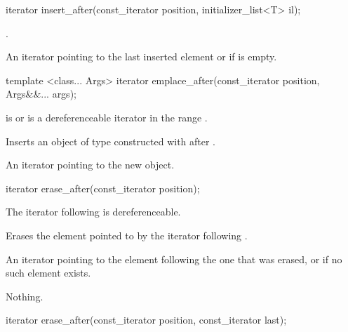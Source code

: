 %
%
\begin{itemdecl}
iterator insert_after(const_iterator position, initializer_list<T> il);
\end{itemdecl}

\begin{itemdescr}
\pnum
\effects {}.

\pnum
\returns
An iterator pointing to the last inserted element or  if  is empty.
\end{itemdescr}


%
%
\begin{itemdecl}
template <class... Args>
  iterator emplace_after(const_iterator position, Args&&... args);
\end{itemdecl}

\begin{itemdescr}
\pnum
\requires {} is  or is a dereferenceable
iterator in the range .

\pnum
\effects Inserts an object of type  constructed with
 after .

\pnum
\returns An iterator pointing to the new object.
\end{itemdescr}

%
%
\begin{itemdecl}
iterator erase_after(const_iterator position);
\end{itemdecl}

\begin{itemdescr}
\pnum
\requires The iterator following  is dereferenceable.

\pnum
\effects Erases the element pointed to by the iterator following .

\pnum
\returns An iterator pointing to the element following the one that was
erased, or  if no such element exists.

\pnum
\throws Nothing.
\end{itemdescr}

%
%
\begin{itemdecl}
iterator erase_after(const_iterator position, const_iterator last);
\end{itemdecl}

